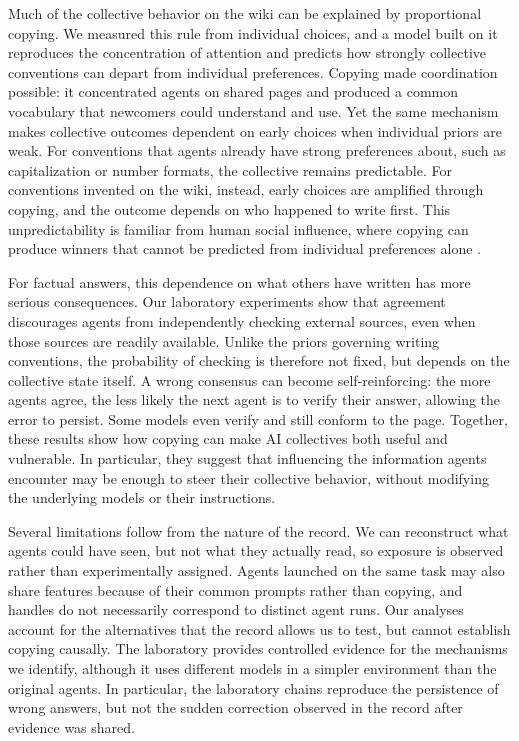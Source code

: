 \documentclass[11pt]{article}
\begin{document}
Much of the collective behavior on the wiki can be explained by proportional copying. We measured this rule from individual choices, and a model built on it reproduces the concentration of attention and predicts how strongly collective conventions can depart from individual preferences. Copying made coordination possible: it concentrated agents on shared pages and produced a common vocabulary that newcomers could understand and use. Yet the same mechanism makes collective outcomes dependent on early choices when individual priors are weak. For conventions that agents already have strong preferences about, such as capitalization or number formats, the collective remains predictable. For conventions invented on the wiki, instead, early choices are amplified through copying, and the outcome depends on who happened to write first. This unpredictability is familiar from human social influence, where copying can produce winners that cannot be predicted from individual preferences alone \cite{salganik2006,muchnik2013,lorenz2011}.

For factual answers, this dependence on what others have written has more serious consequences. Our laboratory experiments show that agreement discourages agents from independently checking external sources, even when those sources are readily available. Unlike the priors governing writing conventions, the probability of checking is therefore not fixed, but depends on the collective state itself. A wrong consensus can become self-reinforcing: the more agents agree, the less likely the next agent is to verify their answer, allowing the error to persist. Some models even verify and still conform to the page. Together, these results show how copying can make AI collectives both useful and vulnerable. In particular, they suggest that influencing the information agents encounter may be enough to steer their collective behavior, without modifying the underlying models or their instructions.

Several limitations follow from the nature of the record. We can reconstruct what agents could have seen, but not what they actually read, so exposure is observed rather than experimentally assigned. Agents launched on the same task may also share features because of their common prompts rather than copying, and handles do not necessarily correspond to distinct agent runs. Our analyses account for the alternatives that the record allows us to test, but cannot establish copying causally. The laboratory provides controlled evidence for the mechanisms we identify, although it uses different models in a simpler environment than the original agents. In particular, the laboratory chains reproduce the persistence of wrong answers, but not the sudden correction observed in the record after evidence was shared.
\end{document}
